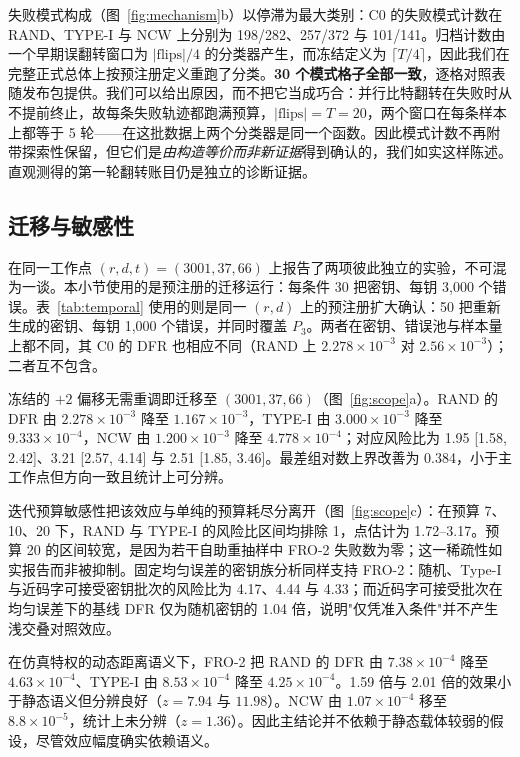 \documentclass[UTF8,a4paper,10pt,twocolumn]{ctexart}
\begin{document}
失败模式构成（图~\ref{fig:mechanism}b）以停滞为最大类别：C0 的失败模式计数在 RAND、TYPE-I 与 NCW 上分别为 198/282、257/372 与 101/141。归档计数由一个早期误翻转窗口为 $\lvert\mathrm{flips}\rvert/4$ 的分类器产生，而冻结定义为 $\lceil T/4\rceil$，因此我们在完整正式总体上按预注册定义重跑了分类。\textbf{30 个模式格子全部一致}，逐格对照表随发布包提供。我们可以给出原因，而不把它当成巧合：并行比特翻转在失败时从不提前终止，故每条失败轨迹都跑满预算，$\lvert\mathrm{flips}\rvert=T=20$，两个窗口在每条样本上都等于 5 轮——在这批数据上两个分类器是同一个函数。因此模式计数不再附带探索性保留，但它们是\emph{由构造等价而非新证据}得到确认的，我们如实这样陈述。直观测得的第一轮翻转账目仍是独立的诊断证据。

\subsection{迁移与敏感性}\label{sec:transfer}

在同一工作点 $(r,d,t)=(3001,37,66)$ 上报告了两项彼此独立的实验，不可混为一谈。本小节使用的是预注册的迁移运行：每条件 30 把密钥、每钥 3{,}000 个错误。表~\ref{tab:temporal} 使用的则是同一 $(r,d)$ 上的预注册扩大确认：50 把重新生成的密钥、每钥 1{,}000 个错误，并同时覆盖 $P_3$。两者在密钥、错误池与样本量上都不同，其 C0 的 DFR 也相应不同（RAND 上 $2.278\times10^{-3}$ 对 $2.56\times10^{-3}$）；二者互不包含。

冻结的 $+2$ 偏移无需重调即迁移至 $(3001,37,66)$（图~\ref{fig:scope}a）。RAND 的 DFR 由 $2.278\times10^{-3}$ 降至 $1.167\times10^{-3}$，TYPE-I 由 $3.000\times10^{-3}$ 降至 $9.333\times10^{-4}$，NCW 由 $1.200\times10^{-3}$ 降至 $4.778\times10^{-4}$；对应风险比为 1.95 [1.58, 2.42]、3.21 [2.57, 4.14] 与 2.51 [1.85, 3.46]。最差组对数上界改善为 0.384，小于主工作点但方向一致且统计上可分辨。

迭代预算敏感性把该效应与单纯的预算耗尽分离开（图~\ref{fig:scope}c）：在预算 7、10、20 下，RAND 与 TYPE-I 的风险比区间均排除 1，点估计为 1.72--3.17。预算 20 的区间较宽，是因为若干自助重抽样中 FRO-2 失败数为零；这一稀疏性如实报告而非被抑制。固定均匀误差的密钥族分析同样支持 FRO-2：随机、Type-I 与近码字可接受密钥批次的风险比为 4.17、4.44 与 4.33；而近码字可接受批次在均匀误差下的基线 DFR 仅为随机密钥的 1.04 倍，说明"仅凭准入条件"并不产生浅交叠对照效应。

在仿真特权的动态距离语义下，FRO-2 把 RAND 的 DFR 由 $7.38\times10^{-4}$ 降至 $4.63\times10^{-4}$、TYPE-I 由 $8.53\times10^{-4}$ 降至 $4.25\times10^{-4}$。1.59 倍与 2.01 倍的效果小于静态语义但分辨良好（$z=7.94$ 与 $11.98$）。NCW 由 $1.07\times10^{-4}$ 移至 $8.8\times10^{-5}$，统计上未分辨（$z=1.36$）。因此主结论并不依赖于静态载体较弱的假设，尽管效应幅度确实依赖语义。
\end{document}
